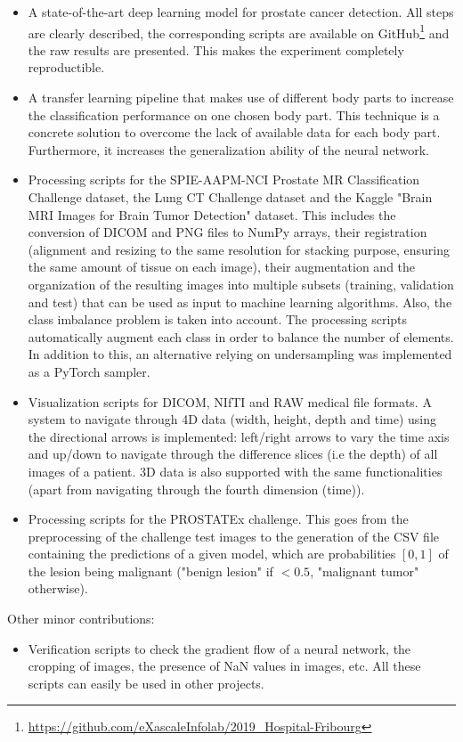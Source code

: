 \begin{itemize}
\item A state-of-the-art deep learning model for prostate cancer detection. All steps are clearly described, the corresponding scripts are available on GitHub\footnote{\url{https://github.com/eXascaleInfolab/2019_Hospital-Fribourg}} and the raw results are presented. This makes the experiment completely reproductible. 

\item A transfer learning pipeline that makes use of different body parts to increase the classification performance on one chosen body part. This technique is a concrete solution to overcome the lack of available data for each body part. Furthermore, it increases the generalization ability of the neural network.


\item Processing scripts for the SPIE-AAPM-NCI Prostate MR Classification Challenge dataset, the Lung CT Challenge dataset and the Kaggle "Brain MRI Images for Brain Tumor Detection" dataset. This includes the conversion of DICOM and PNG files to NumPy arrays, their registration (alignment and resizing to the same resolution for stacking purpose, ensuring the same amount of tissue on each image), their augmentation and the organization of the resulting images into multiple subsets (training, validation and test) that can be used as input to machine learning algorithms. Also, the class imbalance problem is taken into account. The processing scripts automatically augment each class in order to balance the number of elements. In addition to this, an alternative relying on undersampling was implemented as a PyTorch sampler.

\item Visualization scripts for DICOM, NIfTI and RAW medical file formats. A system to navigate through 4D data (width, height, depth and time) using the directional arrows is implemented: left/right arrows to vary the time axis and up/down to navigate through the difference slices (i.e the depth) of all images of a patient. 3D data is also supported with the same functionalities (apart from navigating through the fourth dimension (time)). 


\item Processing scripts for the PROSTATEx challenge. This goes from the preprocessing of the challenge test images to the generation of the CSV file containing the predictions of a given model, which are probabilities $[0,1]$ of the lesion being malignant ("benign lesion" if $< 0.5$, "malignant tumor" otherwise).

\end{itemize}
Other minor contributions:
\begin{itemize}
\item Verification scripts to check the gradient flow of a neural network, the cropping of images, the presence of NaN values in images, etc. All these scripts can easily be used in other projects.
\end{itemize}


